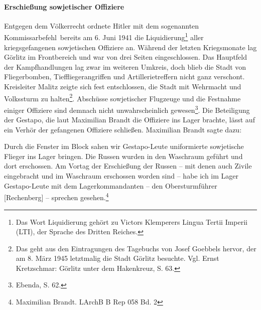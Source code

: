 \documentclass[a4paper,12pt,ngerman,
]{nisebook}
\begin{document}
\paragraph{Erschießung sowjetischer Offiziere}
Entgegen dem Völkerrecht ordnete Hitler mit dem sogenannten \glqq Kommissarbefehl\grqq~bereits am 6. Juni 1941 die \glqq Liquidierung\grqq\footnote{Das Wort Liquidierung gehört zu Victors Klemperers Lingua Tertii Imperii (LTI), der Sprache des Dritten Reiches.} aller kriegsgefangenen sowjetischen Offiziere an. Während der letzten Kriegsmonate lag Görlitz im Frontbereich und war von drei Seiten eingeschlossen. Das Hauptfeld der Kampfhandlungen lag zwar im weiteren Umkreis, doch blieb die Stadt von Fliegerbomben, Tieffliegerangriffen und Artillerietreffern nicht ganz verschont. Kreisleiter Malitz zeigte sich fest entschlossen, die Stadt mit Wehrmacht und Volkssturm zu halten\footnote{Das geht aus den Eintragungen des Tagebuchs von Josef Goebbels hervor, der am 8. März 1945 letztmalig die Stadt Görlitz besuchte. Vgl. Ernst Kretzschmar: Görlitz unter dem Hakenkreuz, S. 63.}. Abschüsse sowjetischer Flugzeuge und die Festnahme einiger Offiziere sind demnach nicht unwahrscheinlich gewesen\footnote{Ebenda, S. 62.}. Die Beteiligung der Gestapo, die laut Maximilian Brandt die Offiziere ins Lager brachte, lässt auf ein Verhör der gefangenen Offiziere schließen. Maximilian Brandt sagte dazu:
\begin{leftbar}
Durch die Fenster im Block sahen wir Gestapo-Leute uniformierte sowjetische Flieger ins Lager bringen. Die Russen wurden in den Waschraum geführt und dort erschossen. Am Vortag der Erschießung der Russen -- mit denen auch Zivile eingebracht und im Waschraum erschossen worden sind -- habe ich im Lager Gestapo-Leute mit dem Lagerkommandanten -- den Obersturmführer [Rechenberg] -- sprechen gesehen.\footnote{Maximilian Brandt. LArchB B Rep 058 Bd. 2}
\end{leftbar}
\end{document}
